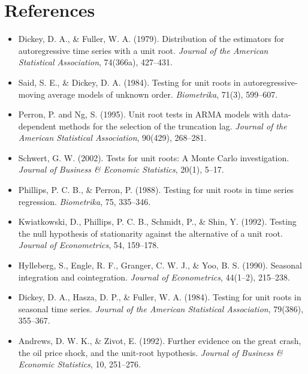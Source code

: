 \documentclass[12pt]{article}
\begin{document}
	\section*{References}
	\begin{itemize}
		\item Dickey, D. A., \& Fuller, W. A. (1979). Distribution of the estimators for autoregressive time series with a unit root. \textit{Journal of the American Statistical Association}, 74(366a), 427--431.
		\item Said, S. E., \& Dickey, D. A. (1984). Testing for unit roots in autoregressive-moving average models of unknown order. \textit{Biometrika}, 71(3), 599--607.
		\item Perron, P. and Ng, S. (1995). Unit root tests in ARMA models with data-dependent methods for the selection of the truncation lag. \textit{Journal of the American Statistical Association}, 90(429), 268--281.
		\item Schwert, G. W. (2002). Tests for unit roots: A Monte Carlo investigation. \textit{Journal of Business \& Economic Statistics}, 20(1), 5--17.
		\item Phillips, P. C. B., \& Perron, P. (1988). Testing for unit roots in time series regression. \textit{Biometrika}, 75, 335--346.
		\item Kwiatkowski, D., Phillips, P. C. B., Schmidt, P., \& Shin, Y. (1992). Testing the null hypothesis of stationarity against the alternative of a unit root. \textit{Journal of Econometrics}, 54, 159--178.
		\item Hylleberg, S., Engle, R. F., Granger, C. W. J., \& Yoo, B. S. (1990). Seasonal integration and cointegration. \textit{Journal of Econometrics}, 44(1--2), 215--238.
		\item Dickey, D. A., Hasza, D. P., \& Fuller, W. A. (1984). Testing for unit roots in seasonal time series. \textit{Journal of the American Statistical Association}, 79(386), 355--367.
		\item Andrews, D. W. K., \& Zivot, E. (1992). Further evidence on the great crash, the oil price shock, and the unit-root hypothesis. \textit{Journal of Business \& Economic Statistics}, 10, 251--276.
	\end{itemize}
\end{document}
